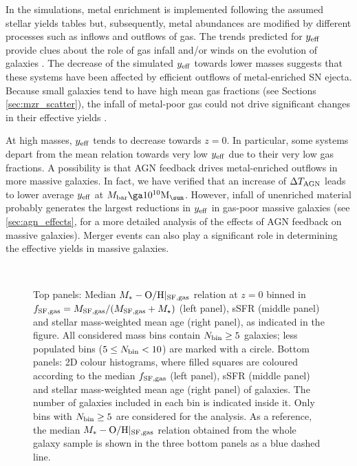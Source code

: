 \documentclass[useAMS,usenatbib]{mn2e}
\begin{document}
In the simulations, metal enrichment is implemented following the assumed stellar yields tables
\citep{portinari1998, marigo2001, thielemann2003} but, subsequently, metal abundances
are modified by different processes such as inflows and outflows of gas.
The trends predicted for $y_{\rm eff}$ provide clues about 
the role of gas infall and/or winds on the evolution of galaxies \citep[e.g.][]{dalcanton2007}.
The decrease of the simulated $y_{\rm eff}$ towards lower masses suggests
that these systems have been affected by efficient outflows of metal-enriched SN ejecta.
Because small galaxies tend to have high mean gas fractions (see Sections  
\ref{sec:mzr_scatter}), the infall of metal-poor gas could
not drive significant changes in their effective yields \citep{dalcanton2007}.

At high masses, $y_{\rm eff}$ tends to decrease towards $z=0$.
In particular, some systems depart from the mean relation towards very low $y_{\rm eff}$ 
due to their very low gas fractions.
A possibility is that AGN feedback drives metal-enriched outflows in more massive galaxies. 
In fact, we have verified that an increase of $\Delta T_{\rm AGN}$ leads to 
lower average $y_{\rm eff}$ at $M_{\rm bar} \ga 10^{10} {\rm M}_{\sun}$.
However, infall of unenriched material probably generates the largest reductions in 
$y_{\rm eff}$ in gas-poor massive galaxies \citep{dalcanton2007} (see 
\ref{sec:agn_effects}, for a more detailed analysis of the effects of AGN feedback 
on massive galaxies).
Merger events can also play a significant role in determining the effective yields 
in massive galaxies. 


\begin{figure*}
\begin{center}
\\
\end{center}
\caption[]
{
Top panels: Median $M_* - {\rm O/H}|_{\rm SF,gas}$ relation at $z=0$ binned in $f_{\rm SF,gas}=M_{\rm SF,gas}/(M_{\rm SF,gas}+M_\star)$ (left panel), 
sSFR (middle panel) and stellar mass-weighted mean age (right panel), as indicated in the figure.
All considered mass bins contain $N_{\rm bin} \ge 5$ galaxies; less populated bins ($ 5 \le N_{\rm bin} < 10$)
are marked with a circle.
Bottom panels: 2D colour histograms, where
filled squares are coloured according to the median $f_{\rm SF,gas}$ (left panel), 
sSFR (middle panel) and stellar mass-weighted mean age (right panel) of galaxies.
The number of galaxies included in each bin is indicated inside it.  Only bins with $N_{\rm bin} \ge 5$ are
considered for the analysis.
As a reference, the median $M_* - {\rm O/H}|_{\rm SF,gas}$ relation obtained from the whole galaxy sample is shown 
in the three bottom panels as a blue dashed line.
}
\label{fig:MZR_bin}
\end{figure*}
\end{document}
